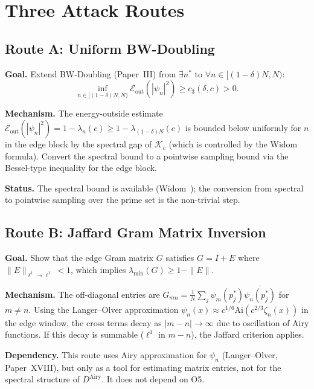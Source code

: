 \documentclass[12pt,a4paper]{amsart}
\theoremstyle{definition}
\begin{document}
\section{Three Attack Routes}
\label{sec:attacks}

\subsection{Route A: Uniform BW-Doubling}

\textbf{Goal.} Extend BW-Doubling (Paper~III) from
$\exists n^*$ to $\forall n \in [(1-\delta)N, N)$:
\[
  \inf_{n \in [(1-\delta)N, N)}
  \mathcal{E}_{\mathrm{out}}(|\psi_n|^2) \ge c_3(\delta,c) > 0.
\]

\textbf{Mechanism.} The energy-outside estimate
$\mathcal{E}_{\mathrm{out}}(|\psi_n|^2) =
1 - \lambda_n(c) \ge 1 - \lambda_{(1-\delta)N}(c)$
is bounded below uniformly for $n$ in the edge block
by the spectral gap of $\mathcal{K}_c$
(which is controlled by the Widom formula).
Convert the spectral bound to a pointwise sampling bound
via the Bessel-type inequality for the edge block.

\textbf{Status.} The spectral bound is available (Widom~\cite{Widom1964});
the conversion from spectral to pointwise sampling
over the prime set is the non-trivial step.

\subsection{Route B: Jaffard Gram Matrix Inversion}

\textbf{Goal.} Show that the edge Gram matrix $G$
satisfies $G = I + E$ where $\|E\|_{\ell^1 \to \ell^1} < 1$,
which implies $\lambda_{\min}(G) \ge 1 - \|E\|$.

\textbf{Mechanism.}
The off-diagonal entries are
$G_{mn} = \frac{1}{N}\sum_j \psi_m(p_j^*)\overline{\psi_n(p_j^*)}$
for $m \ne n$.
Using the Langer--Olver approximation
$\psi_n(x) \approx c^{1/6}\mathrm{Ai}(c^{2/3}\zeta_n(x))$
in the edge window, the cross terms decay as $|m-n| \to \infty$
due to oscillation of Airy functions.
If this decay is summable ($\ell^1$ in $m-n$),
the Jaffard criterion applies.

\textbf{Dependency.} This route uses Airy approximation
for $\psi_n$ (Langer--Olver, Paper~XVIII),
but only as a tool for estimating matrix entries,
not for the spectral structure of $D^{\mathrm{Airy}}$.
It does not depend on O5.
\end{document}
